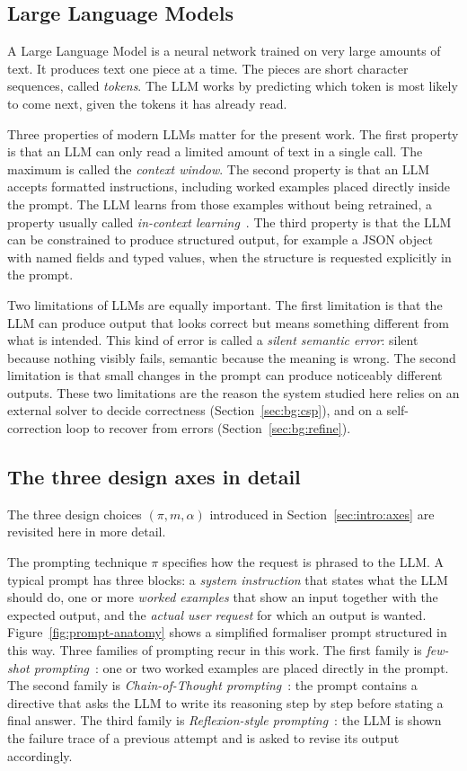 \documentclass[11pt,a4paper]{article}
\begin{document}
\subsection{Large Language Models}\label{sec:bg:llm}
A Large Language Model is a neural network trained on very large amounts of text. It produces text one piece at a time. The pieces are short character sequences, called \emph{tokens}. The LLM works by predicting which token is most likely to come next, given the tokens it has already read.

Three properties of modern LLMs matter for the present work. The first property is that an LLM can only read a limited amount of text in a single call. The maximum is called the \emph{context window}. The second property is that an LLM accepts formatted instructions, including worked examples placed directly inside the prompt. The LLM learns from those examples without being retrained, a property usually called \emph{in-context learning}~\cite{R3}. The third property is that the LLM can be constrained to produce structured output, for example a JSON object with named fields and typed values, when the structure is requested explicitly in the prompt.

Two limitations of LLMs are equally important. The first limitation is that the LLM can produce output that looks correct but means something different from what is intended. This kind of error is called a \emph{silent semantic error}: silent because nothing visibly fails, semantic because the meaning is wrong. The second limitation is that small changes in the prompt can produce noticeably different outputs. These two limitations are the reason the system studied here relies on an external solver to decide correctness (Section~\ref{sec:bg:csp}), and on a self-correction loop to recover from errors (Section~\ref{sec:bg:refine}).

\subsection{The three design axes in detail}\label{sec:bg:axes}
The three design choices $(\pi, m, \alpha)$ introduced in Section~\ref{sec:intro:axes} are revisited here in more detail.

The prompting technique $\pi$ specifies how the request is phrased to the LLM. A typical prompt has three blocks: a \emph{system instruction} that states what the LLM should do, one or more \emph{worked examples} that show an input together with the expected output, and the \emph{actual user request} for which an output is wanted. Figure~\ref{fig:prompt-anatomy} shows a simplified formaliser prompt structured in this way. Three families of prompting recur in this work. The first family is \emph{few-shot prompting}~\cite{R3}: one or two worked examples are placed directly in the prompt. The second family is \emph{Chain-of-Thought prompting}~\cite{R3}: the prompt contains a directive that asks the LLM to write its reasoning step by step before stating a final answer. The third family is \emph{Reflexion-style prompting}~\cite{R4}: the LLM is shown the failure trace of a previous attempt and is asked to revise its output accordingly.
\end{document}
